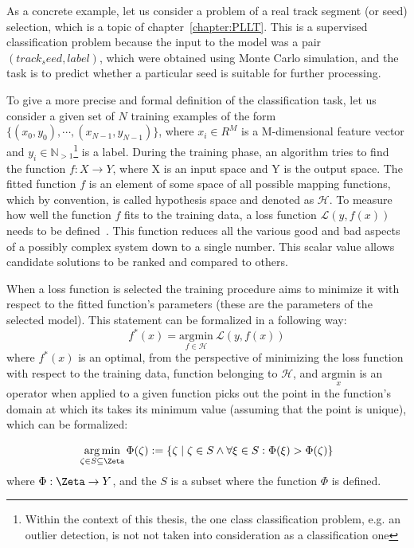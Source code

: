 As a concrete example, let us consider a problem of a real track segment (or seed) selection, which is a topic of chapter~\ref{chapter:PLLT}. This is a supervised classification problem because the input to the model was a pair $(track_seed, label)$, which were obtained using Monte Carlo simulation, and the task is to predict whether a particular seed is suitable for further processing.

To give a more precise and formal definition of the classification task, let us consider a given set of $N$ training examples of the form  $\{(x_0,y_0), \dotsb , (x_{N-1} , y_{N-1})\}$, where $x_{i} \in R^{M}$ is a M-dimensional feature vector and $y_i \in \mathbb{N}_{>1}$\footnote{Within the context of this thesis, the one class classification problem, e.g. an outlier detection, is not not taken into consideration as a classification one} is a label. During the training phase, an algorithm tries to find the function $f: X\rightarrow Y$, where X is an input space and Y is the output space. The fitted function $f$ is an element of some space of all possible mapping functions, which by convention, is called hypothesis space and denoted as $\mathcal{H}$. To measure how well the function $f$ fits to the training data, a loss function $\mathcal{L}(y,f(x))$ needs to be defined~\cite{DLBook}. This function reduces all the various good and bad aspects of a possibly complex system down to a single number. This scalar value allows candidate solutions to be ranked and compared to others.


When a loss function is selected the training procedure aims to minimize it with respect to the fitted function's parameters (these are the parameters of the selected model). This statement can be formalized in a following way: 
\begin{equation} \label{eq:loss}
f^*(x) = \underset{f \in \mathcal{H}}{\mathrm{argmin}} ~  \mathcal{L}(y,f(x))
\end{equation}
where $f^*(x)$ is an optimal, from the perspective of minimizing the loss function with respect to the training data, function belonging to $\mathcal{H}$, and $ \underset{x}{\mathrm{argmin}}$ is an operator when applied to a given function picks out the point in the function's domain at which its takes its minimum value (assuming that the point is unique), which can be formalized:

\begin{equation}
   \underset{\zeta \in S\subseteq \Zeta}{\operatorname{arg\,min}}\, \Phi(\zeta) := \{\zeta \mid \zeta \in S \wedge \forall \xi \in S : \Phi(\xi) > \Phi(\zeta)\}
\end{equation}
where $\Phi:\Zeta \rightarrow Y$, and the $S$ is a subset where the function $\Phi$ is defined.  

